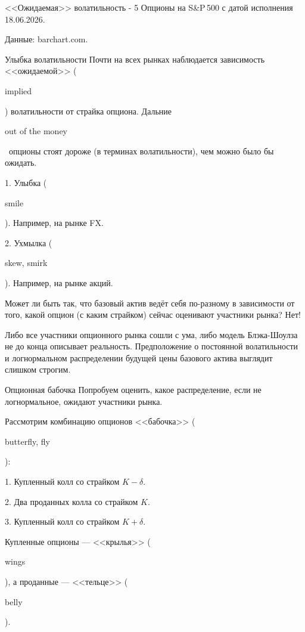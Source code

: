 \documentclass{beamer}
\newcommand{\en}[1]{\begin{otherlanguage}{english}#1\end{otherlanguage}}
\begin{document}
\begin{frame}{<<Ожидаемая>> волатильность - 5}
\justify
Опционы на S\&P\,500 с датой исполнения 18.06.2026.

\centering
{}

\scriptsize Данные: barchart.com.
\end{frame}



\begin{frame}{Улыбка волатильности}
\justify
Почти на всех рынках наблюдается зависимость <<ожидаемой>> (\en{implied}) волатильности от страйка опциона. Дальние \en{out of the money}\ опционы стоят дороже (в терминах волатильности), чем можно было бы ожидать.

1. Улыбка (\en{smile}). Например, на рынке FX.

2. Ухмылка (\en{skew, smirk}). Например, на рынке акций.

\justify
Может ли быть так, что базовый актив ведёт себя по-разному в зависимости от того, какой опцион (с каким страйком) сейчас оценивают участники рынка? Нет!

\justify
Либо все участники опционного рынка сошли с ума, либо модель Блэка-Шоулза не до конца описывает реальность. Предположение о постоянной волатильности и логнормальном распределении будущей цены базового актива выглядит слишком строгим.
\end{frame}



\begin{frame}{Опционная бабочка}
\justify
Попробуем оценить, какое распределение, если не логнормальное, ожидают участники рынка.

\justify
Рассмотрим комбинацию опционов <<бабочка>> (\en{butterfly, fly}):

1. Купленный колл со страйком $K - \delta$.

2. Два проданных колла со страйком $K$.

3. Купленный колл со страйком $K + \delta$.

\justify
Купленные опционы --- <<крылья>> (\en{wings}), а проданные --- <<тельце>> (\en{belly}).
\end{frame}
\end{document}
